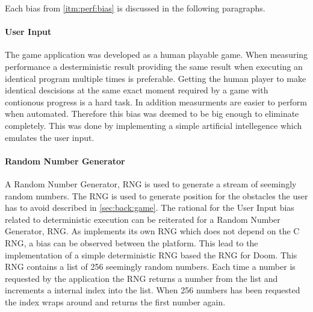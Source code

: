 Each bias from \autoref{itm:perf:bias} is discussed in the following paragraphs.

\paragraph{User Input} The game application was developed as a human playable game.
When measuring performance a desterministic result providing the same result when executing an identical program multiple times is preferable.
Getting the human player to make identical descisions at the same exact moment required by a game with contionous progress is a hard task.
In addition measurments are easier to perform when automated.
Therefore this bias was deemed to be big enough to eliminate completely.
This was done by implementing a simple artificial intellegence which emulates the user input.

\paragraph{Random Number Generator}
A Random Number Generator, RNG is used to generate a stream of seemingly random numbers.
The RNG is used to generate position for the obstacles the user has to avoid described in \autoref{sec:back:game}.
The rational for the User Input bias related to deterministic execution can be reiterated for a Random Number Generator, RNG.
As {\rust} implements its own RNG which does not depend on the C RNG, a bias can be observed between the platform.
This lead to the implementation of a simple deterministic RNG based the RNG for Doom.
This RNG contains a list of 256 seemingly random numbers.
Each time a number is requested by the application the RNG returns a number from the list and increments a internal index into the list.
When 256 numbers has been requested the index wraps around and returns the first number again.

